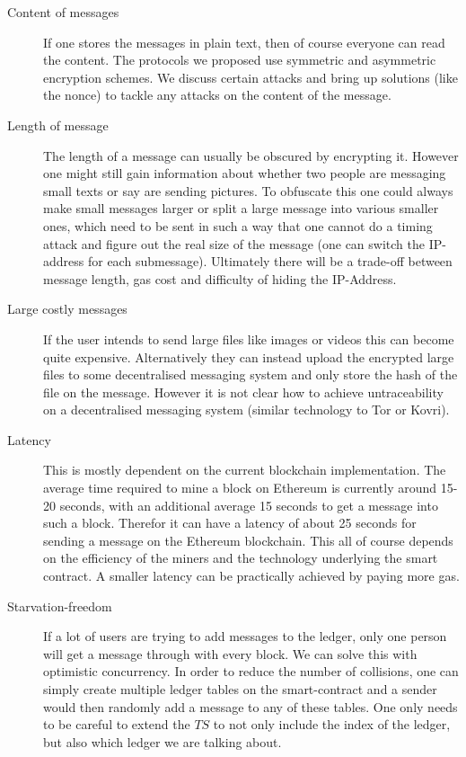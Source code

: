 \documentclass[a4paper]{article} %
\begin{document}
\begin{description}
    \item[Content of messages] If one stores the messages in plain text, then of course everyone can read the content. The protocols we proposed use symmetric and asymmetric encryption schemes. We discuss certain attacks and bring up solutions (like the nonce) to tackle any attacks on the content of the message.
    
    \item[Length of message] The length of a message can usually be obscured by encrypting it. However one might still gain information about whether two people are messaging small texts or say are sending pictures. To obfuscate this one could always make small messages larger or split a large message into various smaller ones, which need to be sent in such a way that one cannot do a timing attack and figure out the real size of the message (one can switch the IP-address for each submessage). Ultimately there will be a trade-off between message length, gas cost and difficulty of hiding the IP-Address.
    
    \item[Large costly messages] If the user intends to send large files like images or videos this can become quite expensive. Alternatively they can instead upload the encrypted large files to some decentralised messaging system and only store the hash of the file on the message. However it is not clear how to achieve untraceability on a decentralised messaging system (similar technology to Tor or Kovri).

    \item[Latency] This is mostly dependent on the current blockchain implementation. The average time required to mine a block on Ethereum is currently around 15-20 seconds, with an additional average 15 seconds to get a message into such a block. Therefor it can have a latency of about 25 seconds for sending a message on the Ethereum blockchain. This all of course depends on the efficiency of the miners and the technology underlying the smart contract. A smaller latency can be practically achieved by paying more gas. 

    \item[Starvation-freedom] 
    If a lot of users are trying to add messages to the ledger, only one person will get a message through with every block. We can solve this with optimistic concurrency.
    In order to reduce the number of collisions, one can simply create multiple ledger tables on the smart-contract and a sender would then randomly add a message to any of these tables. One only needs to be careful to extend the $TS$ to not only include the index of the ledger, but also which ledger we are talking about.
    
\end{description}
\end{document}
